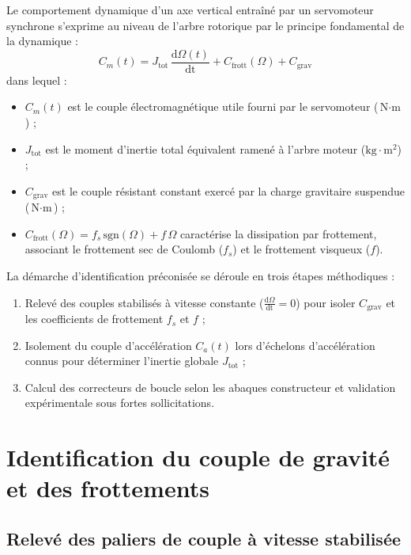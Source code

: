 \documentclass[12pt,a4paper]{article}
\begin{document}
Le comportement dynamique d'un axe vertical entraîné par un servomoteur synchrone s'exprime au niveau de l'arbre rotorique par le principe fondamental de la dynamique :
\begin{equation}
C_m(t) = J_{\text{tot}} \, \frac{\mathrm{d}\Omega(t)}{\mathrm{dt}} + C_{\text{frott}}(\Omega) + C_{\text{grav}}
\label{eq:modele_dynamique}
\end{equation}
dans lequel :
\begin{itemize}
    \item $C_m(t)$ est le couple électromagnétique utile fourni par le servomoteur ($\text{N}\cdot\text{m}$) ;
    \item $J_{\text{tot}}$ est le moment d'inertie total équivalent ramené à l'arbre moteur ($\text{kg}\cdot\text{m}^2$) ;
    \item $C_{\text{grav}}$ est le couple résistant constant exercé par la charge gravitaire suspendue ($\text{N}\cdot\text{m}$) ;
    \item $C_{\text{frott}}(\Omega) = f_s \, \mathrm{sgn}(\Omega) + f \, \Omega$ caractérise la dissipation par frottement, associant le frottement sec de Coulomb ($f_s$) et le frottement visqueux ($f$).
\end{itemize}

La démarche d'identification préconisée se déroule en trois étapes méthodiques :
\begin{enumerate}
    \item Relevé des couples stabilisés à vitesse constante ($\frac{\mathrm{d}\Omega}{\mathrm{dt}} = 0$) pour isoler $C_{\text{grav}}$ et les coefficients de frottement $f_s$ et $f$ ;
    \item Isolement du couple d'accélération $C_a(t)$ lors d'échelons d'accélération connus pour déterminer l'inertie globale $J_{\text{tot}}$ ;
    \item Calcul des correcteurs de boucle selon les abaques constructeur et validation expérimentale sous fortes sollicitations.
\end{enumerate}

\clearpage

\section{Identification du couple de gravité et des frottements}

\subsection{Relevé des paliers de couple à vitesse stabilisée}
\end{document}
